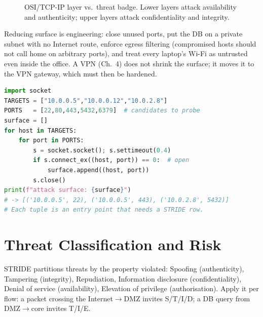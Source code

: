 \begin{figure}[h]\centering
{}
\caption{OSI/TCP-IP layer vs.\ threat badge. Lower layers attack availability and authenticity; upper layers attack confidentiality and integrity.}
\label{fig:layer-threat}
\end{figure}

Reducing surface is engineering: close unused ports, put the DB on a private
subnet with no Internet route, enforce egress filtering (compromised hosts
should not call home on arbitrary ports), and treat every laptop's Wi-Fi as
untrusted even inside the office. A VPN (Ch.~4) does not shrink the surface;
it moves it to the VPN gateway, which must then be hardened.

\begin{lstlisting}[language=Python,caption={Enumerating the network attack surface from a simple port scan.},label={lst:surface}]
import socket
TARGETS = ["10.0.0.5","10.0.0.12","10.0.2.8"]
PORTS   = [22,80,443,5432,6379]  # candidates to probe
surface = []
for host in TARGETS:
    for port in PORTS:
        s = socket.socket(); s.settimeout(0.4)
        if s.connect_ex((host, port)) == 0:  # open
            surface.append((host, port))
        s.close()
print(f"attack surface: {surface}")
# -> [('10.0.0.5', 22), ('10.0.0.5', 443), ('10.0.2.8', 5432)]
# Each tuple is an entry point that needs a STRIDE row.
\end{lstlisting}

\section{Threat Classification and Risk}\label{sec:stride}
STRIDE partitions threats by the property violated: Spoofing (authenticity),
Tampering (integrity), Repudiation, Information disclosure (confidentiality),
Denial of service (availability), Elevation of privilege (authorisation).
Apply it per flow: a packet crossing the Internet$\to$DMZ invites S/T/I/D; a
DB query from DMZ$\to$core invites T/I/E.

